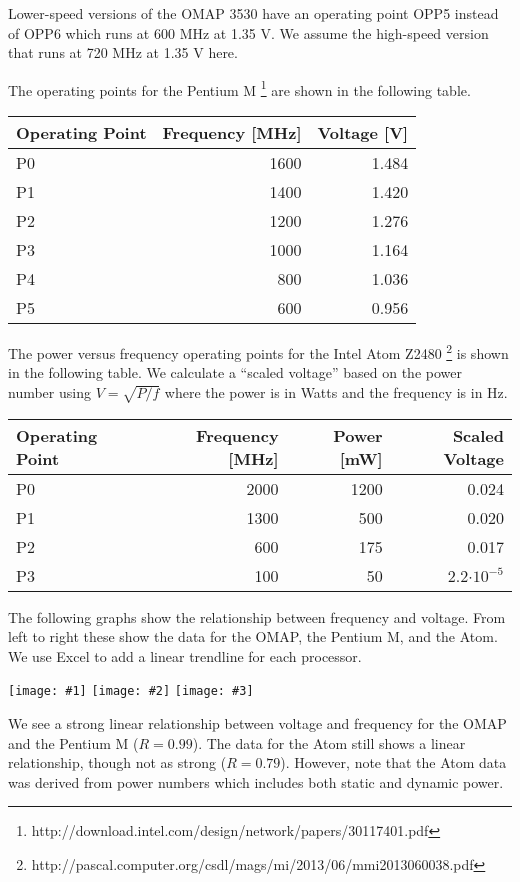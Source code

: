 \documentclass[11pt, letterpaper]{article}
\providecommand{\e}[1]{\ensuremath{\cdot 10^{#1}}}
\providecommand{\tripfig}[3]{
		\noindent
		\begin{center}
		\hspace{-0.3in}
		\texttt{[image: \#1]} \hspace{-0.3in}
		\texttt{[image: \#2]} \hspace{-0.3in}
		\texttt{[image: \#3]} \hspace{-0.3in}
		\end{center}
	}
\begin{document}
Lower-speed versions of the OMAP 3530 have an operating point OPP5 instead of OPP6 which runs at 600 MHz at 1.35 V. We assume the high-speed version that runs at 720 MHz at 1.35 V here.

The operating points for the Pentium M
\footnote{http://download.intel.com/design/network/papers/30117401.pdf} are
shown in the following table.

\begin{tabular}{|l|r|r|}
\hline
Operating Point & Frequency [MHz] & Voltage [V] \\ \hline\hline
P0 & 1600 & 1.484 \\ \hline   
P1 & 1400 & 1.420 \\ \hline   
P2 & 1200 & 1.276 \\ \hline   
P3 & 1000 & 1.164 \\ \hline   
P4 & 800  & 1.036 \\ \hline   
P5 & 600  & 0.956 \\ \hline   
\end{tabular}

The power versus frequency operating points for the Intel Atom Z2480
\footnote{http://pascal.computer.org/csdl/mags/mi/2013/06/mmi2013060038.pdf} is
shown in the following table. We calculate a ``scaled voltage'' based on the power number
using $V = \sqrt{P/f}$ where the power is in Watts and the frequency is in Hz.

\begin{tabular}{|l|r|r|r|}
\hline
Operating Point & Frequency [MHz] & Power [mW] & Scaled Voltage \\ \hline\hline
P0 & 2000 & 1200 & 0.024\\ \hline   
P1 & 1300 & 500 & 0.020 \\ \hline   
P2 & 600 & 175 & 0.017 \\ \hline   
P3 & 100 & 50 & 2.2\e{-5} \\ \hline   
\end{tabular}

The following graphs show the relationship between frequency and voltage. From
left to right these show the data for the OMAP, the Pentium M, and the Atom. We
use Excel to add a linear trendline for each processor.
\tripfig{figs/omap.pdf}{figs/pentiumm.pdf}{figs/medfield.pdf}
We see a strong linear relationship between voltage and frequency for the OMAP
and the Pentium M ($R = 0.99$). The data for the Atom still shows a linear
relationship, though not as strong ($R = 0.79$). However, note that the Atom data was
derived from power numbers which includes both static and dynamic power.
\end{document}
